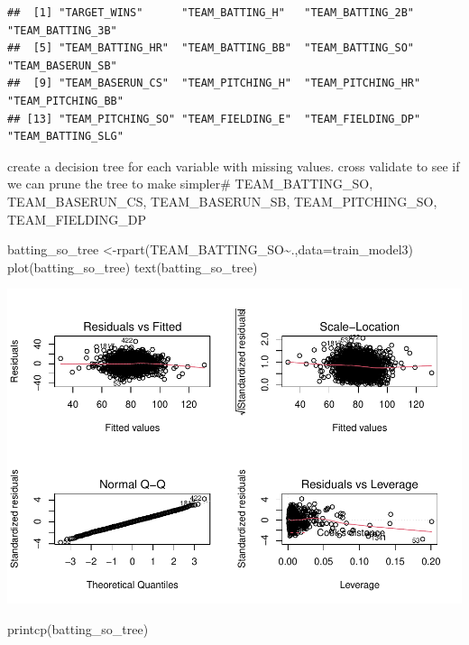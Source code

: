 \documentclass[
]{article}
\newenvironment{Shaded}{\begin{snugshade}}{\end{snugshade}}
\newcommand{\AttributeTok}[1]{\textcolor[rgb]{0.77,0.63,0.00}{#1}}
\newcommand{\FunctionTok}[1]{\textcolor[rgb]{0.00,0.00,0.00}{#1}}
\newcommand{\NormalTok}[1]{#1}
\newcommand{\OtherTok}[1]{\textcolor[rgb]{0.56,0.35,0.01}{#1}}
\newcommand{\SpecialCharTok}[1]{\textcolor[rgb]{0.00,0.00,0.00}{#1}}
\begin{document}
\begin{verbatim}
##  [1] "TARGET_WINS"      "TEAM_BATTING_H"   "TEAM_BATTING_2B"  "TEAM_BATTING_3B" 
##  [5] "TEAM_BATTING_HR"  "TEAM_BATTING_BB"  "TEAM_BATTING_SO"  "TEAM_BASERUN_SB" 
##  [9] "TEAM_BASERUN_CS"  "TEAM_PITCHING_H"  "TEAM_PITCHING_HR" "TEAM_PITCHING_BB"
## [13] "TEAM_PITCHING_SO" "TEAM_FIELDING_E"  "TEAM_FIELDING_DP" "TEAM_BATTING_SLG"
\end{verbatim}

create a decision tree for each variable with missing values. cross
validate to see if we can prune the tree to make simpler\#
TEAM\_BATTING\_SO, TEAM\_BASERUN\_CS, TEAM\_BASERUN\_SB,
TEAM\_PITCHING\_SO, TEAM\_FIELDING\_DP

\begin{Shaded}
\begin{Highlighting}[]
\NormalTok{batting\_so\_tree }\OtherTok{\textless{}{-}}\FunctionTok{rpart}\NormalTok{(TEAM\_BATTING\_SO}\SpecialCharTok{\textasciitilde{}}\NormalTok{.,}\AttributeTok{data=}\NormalTok{train\_model3)}
\FunctionTok{plot}\NormalTok{(batting\_so\_tree)}
\FunctionTok{text}\NormalTok{(batting\_so\_tree)}
\end{Highlighting}
\end{Shaded}

\includegraphics{Assignment1_files/figure-latex/unnamed-chunk-26-1.pdf}

\begin{Shaded}
\begin{Highlighting}[]
\FunctionTok{printcp}\NormalTok{(batting\_so\_tree)}
\end{Highlighting}
\end{Shaded}
\end{document}
